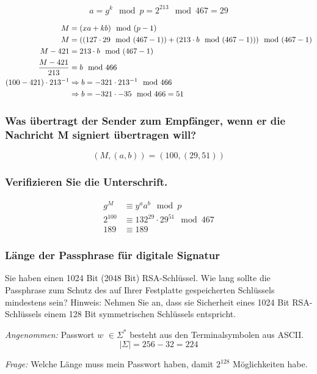 \[ a = g^k \mod p = 2^213 \mod 467 = 29 \]

\begin{align}
	                 M &= (xa + kb) \mod (p-1) \\
                     M &= ((127\cdot 29 \mod (467-1)) + (213 \cdot b \mod (467-1))) \mod (467-1) \\
               M - 421 &=  213 \cdot b \mod (467-1) \\
	\dfrac{M-421}{213} &= b \mod 466 \\
	(100 - 421) \cdot 213^{-1} &\Rightarrow b = -321\cdot 213^{-1} \mod 466 \\
							   &\Rightarrow b = -321 \cdot -35 \mod 466 = 51	
\end{align}

\subsubsection{Was übertragt der Sender zum Empfänger, wenn er die Nachricht M signiert
übertragen will?}

	\[ (M, (a,b)) = (100, (29,51)) \]

\subsubsection{Verifizieren Sie die Unterschrift.}

\begin{align}
	g^M     &\equiv y^a a^b \mod p 					\\
	2^{100} &\equiv 132^{29} \cdot 29^{51} \mod 467	\\
	189     &\equiv 189		
\end{align}

\subsubsection{Länge der Passphrase für digitale Signatur}

Sie haben einen 1024 Bit (2048 Bit) RSA-Schlüssel. Wie lang sollte die Passphrase
zum Schutz des auf Ihrer Festplatte gespeicherten Schlüssels mindestens sein?
Hinweis: Nehmen Sie an, dass sie Sicherheit eines 1024 Bit RSA-Schlüssels einem
128 Bit symmetrischen Schlüssels entspricht.

\textit{Angenommen:} Passwort $w$ $\in \Sigma^*$ besteht aus den Terminalsymbolen aus ASCII.
\[|\Sigma| = 256-32 = 224\]

\textit{Frage:} Welche Länge muss mein Passwort haben, damit $2^128$ Möglichkeiten habe.

